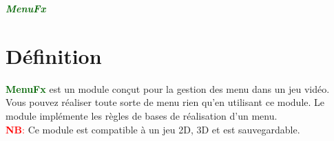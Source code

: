 \documentclass[a4paper, 11pt]{article}
\begin{document}
	\pagecolor{silver}
	\huge{\hspace{15.8cm}\textit{\textbf{\textcolor{darkgreen}{MenuFx}}}}\large{} \tableofcontents \newpage
	\section{Définition}
	\textcolor{darkgreen}{\textbf{MenuFx}} est un module conçut pour la gestion des menu dans un jeu vidéo.
	Vous pouvez réaliser toute sorte de menu rien qu'en utilisant ce module. Le module implémente les règles
	de bases de réalisation d'un menu.\\
	\textcolor{red}{\textbf{NB}:} Ce module est compatible à un jeu 2D, 3D et est sauvegardable.

\end{document}
